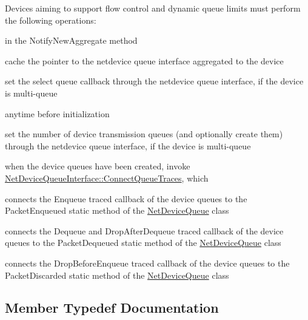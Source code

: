 Devices aiming to support flow control and dynamic queue limits must perform the following operations\+:
\begin{DoxyItemize}
\item in the Notify\+New\+Aggregate method
\begin{DoxyItemize}
\item cache the pointer to the netdevice queue interface aggregated to the device
\item set the select queue callback through the netdevice queue interface, if the device is multi-\/queue
\end{DoxyItemize}
\item anytime before initialization
\begin{DoxyItemize}
\item set the number of device transmission queues (and optionally create them) through the netdevice queue interface, if the device is multi-\/queue
\end{DoxyItemize}
\item when the device queues have been created, invoke \hyperlink{classns3_1_1NetDeviceQueueInterface_acaa7ba9c954d410eca3d2d9a2a69fe09}{Net\+Device\+Queue\+Interface\+::\+Connect\+Queue\+Traces}, which
\begin{DoxyItemize}
\item connects the Enqueue traced callback of the device queues to the Packet\+Enqueued static method of the \hyperlink{classns3_1_1NetDeviceQueue}{Net\+Device\+Queue} class
\item connects the Dequeue and Drop\+After\+Dequeue traced callback of the device queues to the Packet\+Dequeued static method of the \hyperlink{classns3_1_1NetDeviceQueue}{Net\+Device\+Queue} class
\item connects the Drop\+Before\+Enqueue traced callback of the device queues to the Packet\+Discarded static method of the \hyperlink{classns3_1_1NetDeviceQueue}{Net\+Device\+Queue} class 
\end{DoxyItemize}
\end{DoxyItemize}

\subsection{Member Typedef Documentation}
